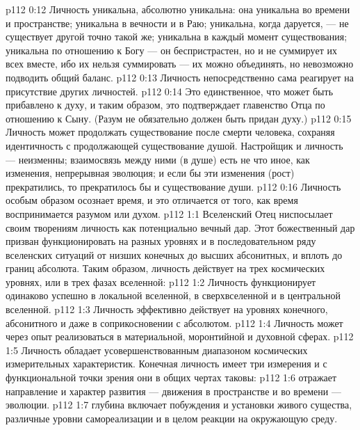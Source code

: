 \vs p112 0:12 \bibnobreakspace Личность уникальна, абсолютно уникальна: она уникальна во времени и пространстве; уникальна в вечности и в Раю; уникальна, когда даруется, --- не существует другой точно такой же; уникальна в каждый момент существования; уникальна по отношению к Богу --- он беспристрастен, но и не суммирует их всех вместе, ибо их нельзя суммировать --- их можно объединять, но невозможно подводить общий баланс.
\vs p112 0:13 \bibnobreakspace Личность непосредственно сама реагирует на присутствие других личностей.
\vs p112 0:14 \bibnobreakspace Это единственное, что может быть прибавлено к духу, и таким образом, это подтверждает главенство Отца по отношению к Сыну. (Разум не обязательно должен быть придан духу.)
\vs p112 0:15 \bibnobreakspace Личность может продолжать существование после смерти человека, сохраняя идентичность с продолжающей существование душой. Настройщик и личность --- неизменны; взаимосвязь между ними (в душе) есть не что иное, как изменения, непрерывная эволюция; и если бы эти изменения (рост) прекратились, то прекратилось бы и существование души.
\vs p112 0:16 \bibnobreakspace Личность особым образом осознает время, и это отличается от того, как время воспринимается разумом или духом.
\vs p112 1:1 Вселенский Отец ниспосылает своим творениям личность как потенциально вечный дар. Этот божественный дар призван функционировать на разных уровнях и в последовательном ряду вселенских ситуаций от низших конечных до высших абсонитных, и вплоть до границ абсолюта. Таким образом, личность действует на трех космических уровнях, или в трех фазах вселенной:
\vs p112 1:2 \bibnobreakspace {} Личность функционирует одинаково успешно в локальной вселенной, в сверхвселенной и в центральной вселенной.
\vs p112 1:3 \bibnobreakspace {} Личность эффективно действует на уровнях конечного, абсонитного и даже в соприкосновении с абсолютом.
\vs p112 1:4 \bibnobreakspace {} Личность может через опыт реализоваться в материальной, моронтийной и духовной сферах.
\vs p112 1:5 \pc Личность обладает усовершенствованным диапазоном космических измерительных характеристик. Конечная личность имеет три измерения и с функциональной точки зрения они в общих чертах таковы:
\vs p112 1:6 \bibnobreakspace {} отражает направление и характер развития --- движения в пространстве и во времени --- эволюции.
\vs p112 1:7 \bibnobreakspace {} глубина включает побуждения и установки живого существа, различные уровни самореализации и в целом реакции на окружающую среду.
